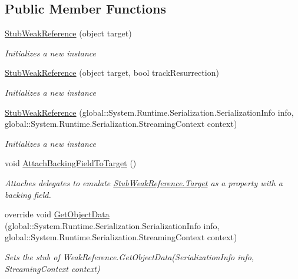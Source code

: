 \subsection*{Public Member Functions}
\begin{DoxyCompactItemize}
\item 
\hyperlink{class_system_1_1_fakes_1_1_stub_weak_reference_ad1e2fe1a52e8c08af19f6d578a181a6b}{Stub\-Weak\-Reference} (object target)
\begin{DoxyCompactList}\small\item\em Initializes a new instance\end{DoxyCompactList}\item 
\hyperlink{class_system_1_1_fakes_1_1_stub_weak_reference_af522896e557a660b82983957c568b4b1}{Stub\-Weak\-Reference} (object target, bool track\-Resurrection)
\begin{DoxyCompactList}\small\item\em Initializes a new instance\end{DoxyCompactList}\item 
\hyperlink{class_system_1_1_fakes_1_1_stub_weak_reference_a84db022f8266b5dae19e122be05b657a}{Stub\-Weak\-Reference} (global\-::\-System.\-Runtime.\-Serialization.\-Serialization\-Info info, global\-::\-System.\-Runtime.\-Serialization.\-Streaming\-Context context)
\begin{DoxyCompactList}\small\item\em Initializes a new instance\end{DoxyCompactList}\item 
void \hyperlink{class_system_1_1_fakes_1_1_stub_weak_reference_a25b8f0829925da30979f3c4de90c3d14}{Attach\-Backing\-Field\-To\-Target} ()
\begin{DoxyCompactList}\small\item\em Attaches delegates to emulate \hyperlink{class_system_1_1_fakes_1_1_stub_weak_reference_a14eb3a1284e00ba40449b5547601c7f5}{Stub\-Weak\-Reference.\-Target} as a property with a backing field.\end{DoxyCompactList}\item 
override void \hyperlink{class_system_1_1_fakes_1_1_stub_weak_reference_a3c9f699a767c90c4a39fe142823f3b4c}{Get\-Object\-Data} (global\-::\-System.\-Runtime.\-Serialization.\-Serialization\-Info info, global\-::\-System.\-Runtime.\-Serialization.\-Streaming\-Context context)
\begin{DoxyCompactList}\small\item\em Sets the stub of Weak\-Reference.\-Get\-Object\-Data(\-Serialization\-Info info, Streaming\-Context context)\end{DoxyCompactList}\end{DoxyCompactItemize}

